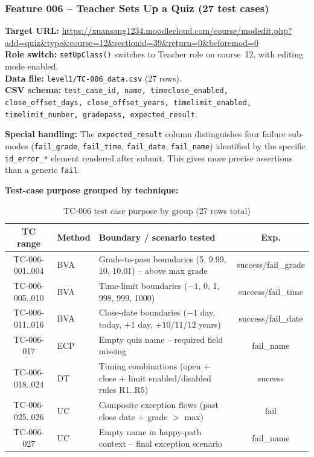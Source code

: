 \documentclass[twoside,final]{hcmut-report}
\begin{document}
\subsubsection{Feature 006 -- Teacher Sets Up a Quiz (27 test cases)}

\textbf{Target URL:} \url{https://xuansang1234.moodlecloud.com/course/modedit.php?add=quiz&type&course=12&sectionid=39&return=0&beforemod=0}\\
\textbf{Role switch:} \texttt{setUpClass()} switches to Teacher role on course~12, with editing mode enabled.\\
\textbf{Data file:} \texttt{level1/TC-006\_data.csv} (27 rows).\\
\textbf{CSV schema:} \texttt{test\_case\_id, name, timeclose\_enabled, close\_offset\_days, close\_offset\_years, timelimit\_enabled, timelimit\_number, gradepass, expected\_result}.

\textbf{Special handling:} The \texttt{expected\_result} column distinguishes four failure sub-modes (\texttt{fail\_grade}, \texttt{fail\_time}, \texttt{fail\_date}, \texttt{fail\_name}) identified by the specific \texttt{id\_error\_*} element rendered after submit. This gives more precise assertions than a generic \texttt{fail}.

\textbf{Test-case purpose grouped by technique:}
\begin{table}[H]
\centering
\renewcommand{\arraystretch}{1.2}
\begin{tabularx}{\textwidth}{|c|l|X|c|}
\hline
\textbf{TC range} & \textbf{Method} & \textbf{Boundary / scenario tested} & \textbf{Exp.} \\ \hline
TC-006-001..004 & BVA & Grade-to-pass boundaries (5, 9.99, 10, 10.01) -- above max grade & success/fail\_grade \\ \hline
TC-006-005..010 & BVA & Time-limit boundaries ($-1$, 0, 1, 998, 999, 1000) & success/fail\_time \\ \hline
TC-006-011..016 & BVA & Close-date boundaries ($-1$ day, today, $+1$ day, $+10$/$11$/$12$ years) & success/fail\_date \\ \hline
TC-006-017 & ECP & Empty quiz name -- required field missing & fail\_name \\ \hline
TC-006-018..024 & DT & Timing combinations (open + close + limit enabled/disabled rules R1..R5) & success \\ \hline
TC-006-025..026 & UC & Composite exception flows (past close date $+$ grade $>$ max) & fail \\ \hline
TC-006-027 & UC & Empty name in happy-path context -- final exception scenario & fail\_name \\ \hline
\end{tabularx}
\caption{TC-006 test case purpose by group (27 rows total)}
\end{table}
\end{document}
